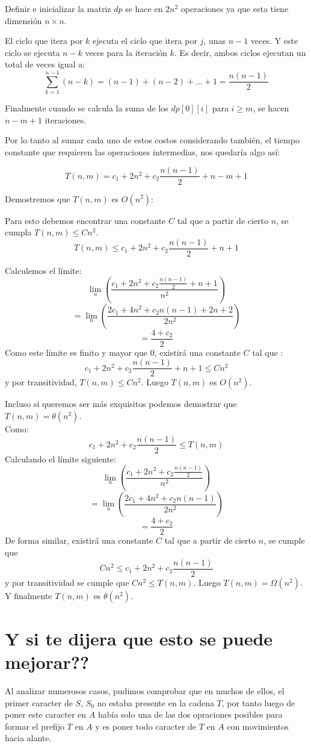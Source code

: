 \documentclass[a4paper]{article}
\begin{document}
	Definir e inicializar la matriz $dp$ se hace en $2n^2$ operaciones ya que esta tiene dimensión $n \times n$.
	
	El ciclo que itera por $k$ ejecuta el ciclo que itera por $j$, unas $n-1$ veces. Y este ciclo se ejecuta $n-k$ veces para la iteración $k$. Es decir, ambos ciclos ejecutan un total de veces igual a:
	$$ \sum_{k=1}^{n-1} (n-k) = (n-1) + (n-2) + ... + 1 = \frac{n(n-1)}{2} $$
	
	Finalmente cuando se calcula la suma de los $dp[0][i]$ para $i \geq m$, se hacen $n-m + 1$ iteraciones.
	
	Por lo tanto al sumar cada uno de estos costos considerando también, el tiempo constante que requieren las operaciones intermedias, nos quedaría algo así:
	
	$$T(n,m) = c_1 + 2n^2 + c_2\frac{n(n-1)}{2} + n-m+1$$
	
	Demostremos que $T(n,m)$ es $O(n^2)$:
	
	Para esto debemos encontrar una constante $C$ tal que a partir de cierto $n$, se cumpla $T(n,m) \leq Cn^2$.
	$$T(n,m) \leq c_1 + 2n^2 + c_2\frac{n(n-1)}{2} + n + 1$$
	
	Calculemos el límite:
	$$ \lim_{n}\left(\frac{c_1 + 2n^2 + c_2\frac{n(n-1)}{2} + n + 1}{n^2}\right)$$
	$$= \lim_{n}\left(\frac{2c_1 + 4n^2 + c_2n(n-1) + 2n + 2}{2n^2}\right)$$
	$$= \frac{4+c_2}{2}$$
	Como este límite es finito y mayor que $0$, existirá una constante $C$ tal que :
	$$ c_1 + 2n^2 + c_2\frac{n(n-1)}{2} + n + 1 \leq Cn^2$$
	y por transitividad, $ T(n,m) \leq Cn^2 $. Luego $T(n,m)$ es $O(n^2)$.
	
	Incluso si queremos ser más exquisitos podemos demostrar que $T(n,m) = \theta(n^2)$. \\
	
	Como:
	$$c_1 + 2n^2 + c_2\frac{n(n-1)}{2} \leq T(n,m)$$
	Calculando el límite siguiente:
	$$ \lim_{n}\left(\frac{c_1 + 2n^2 + c_2\frac{n(n-1)}{2}}{n^2}\right)$$
	$$= \lim_{n}\left(\frac{2c_1 + 4n^2 + c_2n(n-1)}{2n^2}\right)$$
	$$= \frac{4+c_2}{2}$$
	De forma similar, existirá una constante $C$ tal que a partir de cierto $n$, se cumple que 
	$$Cn^2 \leq c_1 + 2n^2 + c_2\frac{n(n-1)}{2}$$
	y por transitividad se cumple que $Cn^2 \leq T(n,m)$. Luego $T(n,m) = \Omega(n^2)$. Y finalmente $T(n,m)$ es $\theta(n^2)$.
	
    \section*{Y si te dijera que esto se puede mejorar??}
    Al analizar numerosos casos, pudimos comprobar que en muchos de ellos, el primer caracter de $S$, $S_0$ no estaba presente en la cadena $T$, por tanto 
    luego de poner este caracter en $A$ hab\'ia solo una de las dos opraciones posibles para formar el prefijo $T$ en $A$ y es poner todo caracter de 
    $T$ en $A$ con movimientos hacia alante.\\ 
\end{document}
